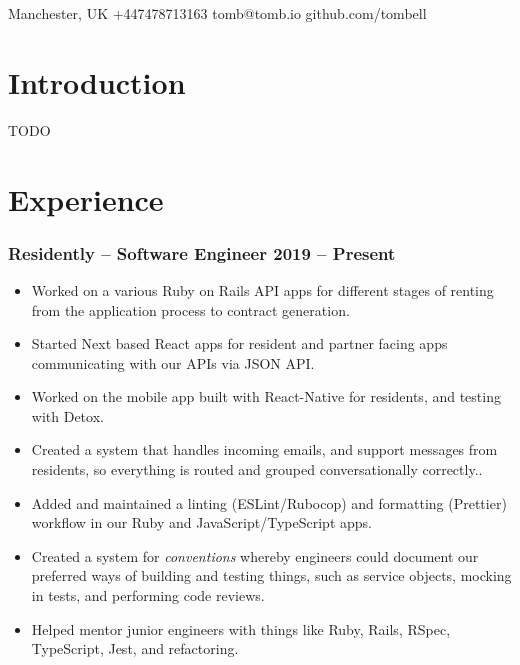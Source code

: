 \documentclass[a4paper]{article}
\author{Tom Bell}
\renewcommand{\maketitle}{
  \begin{center}
    \huge{\textbf\theauthor}
  \end{center}
}
\newcommand{\datedsubsection}[2]{
  \subsubsection{#1 \hfill \textbf{#2}}
}
\begin{document}
\maketitle

\begin{center}
  \raisebox{0\height}{\small\faMapMarker} Manchester, UK
  \hspace{1cm}
  \raisebox{-0.1\height}{\small\faMobile} +447478713163
  \hspace{1cm}
  \raisebox{-0.1\height}{\small\faAt} tomb@tomb.io
  \hspace{1cm}
  \raisebox{-0.1\height}{\small\faGithubAlt} github.com/tombell
\end{center}

\section{Introduction}
\small{TODO}

\section{Experience}

\datedsubsection{\textbf{Residently} -- Software Engineer}{2019 -- Present}
\begin{itemize}
  \item Worked on a various Ruby on Rails API apps for different stages of
    renting from the application process to contract generation.
  \item Started Next based React apps for resident and partner facing apps
    communicating with our APIs via JSON API.
  \item Worked on the mobile app built with React-Native for residents, and
    testing with Detox.
  \item Created a system that handles incoming emails, and support messages from
    residents, so everything is routed and grouped conversationally correctly..
  \item Added and maintained a linting (ESLint/Rubocop) and formatting
    (Prettier) workflow in our Ruby and JavaScript/TypeScript apps.
  \item Created a system for \textit{conventions} whereby engineers could
    document our preferred ways of building and testing things, such as service
    objects, mocking in tests, and performing code reviews.
  \item Helped mentor junior engineers with things like Ruby, Rails, RSpec,
    TypeScript, Jest, and refactoring.
\end{itemize}
\end{document}
